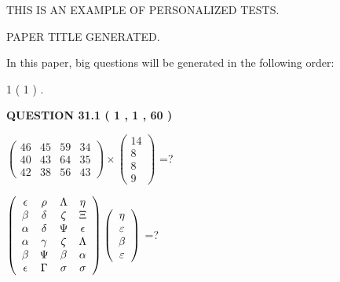 \documentclass[12pt]{article}
\begin{document}
   
   
   
   
   
   
   
 \vspace{0.2in}
{\Huge  THIS IS AN EXAMPLE OF}
{\Huge  PERSONALIZED TESTS. }
   
   
 PAPER TITLE GENERATED.
   
   
   
\vspace{0.2in}
   
In this paper, big questions will be generated in the following order: 
   
   
             1 (           1 )
 .
  
\vspace{0.2in}
  
{\textbf{\Large{QUESTION
31.1 
 (           1 ,           1 ,          60 )
}}}
  
  
 
$ \left( \begin{array}{ccccccccc}
          46  & 
          45  & 
          59  & 
          34  \\ 
          40  & 
          43  & 
          64  & 
          35  \\ 
          42  & 
          38  & 
          56  & 
          43
\end{array}\right) \times
\left( \begin{array}{c}
          14  \\ 
           8  \\ 
           8  \\ 
           9
\end{array}\right) $ =?
 
 
$  %
 \left( \begin{array}
 {
 c
 c
 c
 c
 }
 \epsilon & 
 \rho & 
 \Lambda & 
 \eta \\ 
 \beta & 
 \delta & 
                    \zeta & 
                    \Xi \\ 
 \alpha & 
 \delta & 
 \Psi & 
 \epsilon \\ 
 \alpha & 
 \gamma & 
                    \zeta & 
 \Lambda \\ 
 \beta & 
 \Psi & 
 \beta & 
 \alpha \\ 
 \epsilon & 
 \Gamma & 
 \sigma & 
 \sigma
 \end{array} \right)
 \left( \begin{array}
 {
 c
 }
 \eta \\ 
 \varepsilon \\ 
 \beta \\ 
 \varepsilon
 \end{array} \right)
$ =?
 
\end{document}
